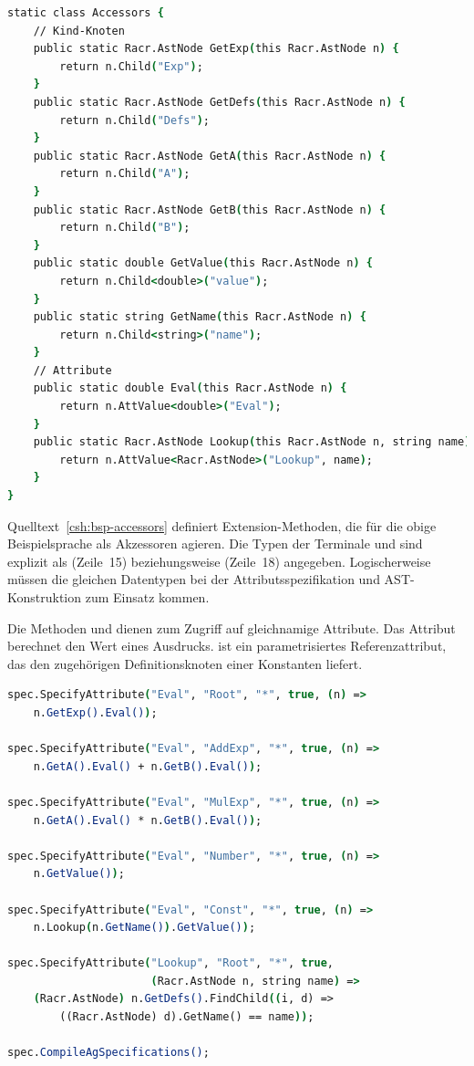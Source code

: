 \begin{lstlisting}[language=csh, caption={Hilfsmethoden für den Zugriff auf Kind-Knoten und Attribute}, label=csh:bsp-accessors]
static class Accessors {
	// Kind-Knoten
	public static Racr.AstNode GetExp(this Racr.AstNode n) {
		return n.Child("Exp");
	}
	public static Racr.AstNode GetDefs(this Racr.AstNode n) {
		return n.Child("Defs");
	}
	public static Racr.AstNode GetA(this Racr.AstNode n) {
		return n.Child("A");
	}
	public static Racr.AstNode GetB(this Racr.AstNode n) {
		return n.Child("B");
	}
	public static double GetValue(this Racr.AstNode n) {
		return n.Child<double>("value");
	}
	public static string GetName(this Racr.AstNode n) {
		return n.Child<string>("name");
	}
	// Attribute
	public static double Eval(this Racr.AstNode n) {
		return n.AttValue<double>("Eval");
	}
	public static Racr.AstNode Lookup(this Racr.AstNode n, string name) {
		return n.AttValue<Racr.AstNode>("Lookup", name);
	}
}
\end{lstlisting}

Quelltext~\ref{csh:bsp-accessors} definiert Extension-Methoden, die für die obige Beispielsprache als Akzessoren agieren. Die Typen der Terminale  und  sind explizit als  (Zeile~15) beziehungsweise  (Zeile~18) angegeben. Logischerweise müssen die gleichen Datentypen bei der Attributsspezifikation und AST-Konstruktion zum Einsatz kommen.

Die Methoden  und  dienen zum Zugriff auf gleichnamige Attribute. Das Attribut  berechnet den Wert eines Ausdrucks.  ist ein parametrisiertes Referenzattribut, das den zugehörigen Definitionsknoten einer Konstanten liefert.

\begin{lstlisting}[language=csh, caption={Attributsspezifikationen}, label=csh:bsp-attribute]
spec.SpecifyAttribute("Eval", "Root", "*", true, (n) =>
	n.GetExp().Eval());

spec.SpecifyAttribute("Eval", "AddExp", "*", true, (n) =>
	n.GetA().Eval() + n.GetB().Eval());

spec.SpecifyAttribute("Eval", "MulExp", "*", true, (n) =>
	n.GetA().Eval() * n.GetB().Eval());

spec.SpecifyAttribute("Eval", "Number", "*", true, (n) =>
	n.GetValue());

spec.SpecifyAttribute("Eval", "Const", "*", true, (n) =>
	n.Lookup(n.GetName()).GetValue());

spec.SpecifyAttribute("Lookup", "Root", "*", true,
					  (Racr.AstNode n, string name) =>
	(Racr.AstNode) n.GetDefs().FindChild((i, d) =>
		((Racr.AstNode) d).GetName() == name));

spec.CompileAgSpecifications();
\end{lstlisting}

